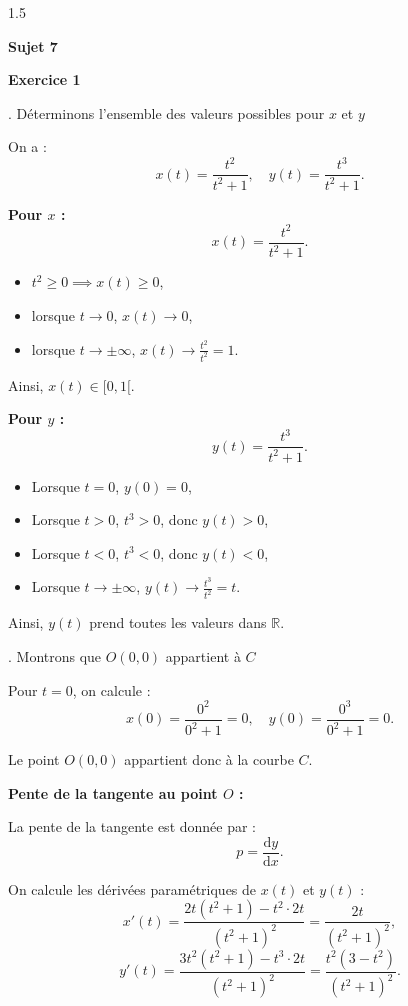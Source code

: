 \documentclass[12pt]{article}
\begin{document}
\begin{spacing}{1.5}
\quad

\medskip\textbf{Sujet 7}

\textbf{Exercice 1}






. Déterminons l'ensemble des valeurs possibles pour \(x\) et \(y\)

On a :
\[
x(t) = \frac{t^2}{t^2 + 1}, \quad y(t) = \frac{t^3}{t^2 + 1}.
\]

\textbf{Pour \(x\) :}
\[
x(t) = \frac{t^2}{t^2 + 1}.
\]
\begin{itemize}
    \item \(t^2 \geq 0 \implies x(t) \geq 0\),
    \item lorsque \(t \to 0\), \(x(t) \to 0\),
    \item lorsque \(t \to \pm\infty\), \(x(t) \to \frac{t^2}{t^2} = 1\).
\end{itemize}

Ainsi, \(x(t) \in [0, 1[\).

\textbf{Pour \(y\) :}
\[
y(t) = \frac{t^3}{t^2 + 1}.
\]
\begin{itemize}
    \item Lorsque \(t = 0\), \(y(0) = 0\),
    \item Lorsque \(t > 0\), \(t^3 > 0\), donc \(y(t) > 0\),
    \item Lorsque \(t < 0\), \(t^3 < 0\), donc \(y(t) < 0\),
    \item Lorsque \(t \to \pm\infty\), \(y(t) \to \frac{t^3}{t^2} = t\).
\end{itemize}

Ainsi, \(y(t)\) prend toutes les valeurs dans \(\mathbb{R}\).

. Montrons que \(O(0,0)\) appartient à \(C\)

Pour \(t = 0\), on calcule :
\[
x(0) = \frac{0^2}{0^2 + 1} = 0, \quad y(0) = \frac{0^3}{0^2 + 1} = 0.
\]

Le point \(O(0,0)\) appartient donc à la courbe \(C\).

\textbf{Pente de la tangente au point \(O\) :}

La pente de la tangente est donnée par :
\[
p = \frac{\mathrm{d}y}{\mathrm{d}x}.
\]

On calcule les dérivées paramétriques de \(x(t)\) et \(y(t)\) :
\[
x'(t) = \frac{2t(t^2 + 1) - t^2 \cdot 2t}{(t^2 + 1)^2} = \frac{2t}{(t^2 + 1)^2},
\]
\[
y'(t) = \frac{3t^2(t^2 + 1) - t^3 \cdot 2t}{(t^2 + 1)^2} = \frac{t^2(3 - t^2)}{(t^2 + 1)^2}.
\]


\end{spacing}
\end{document}
